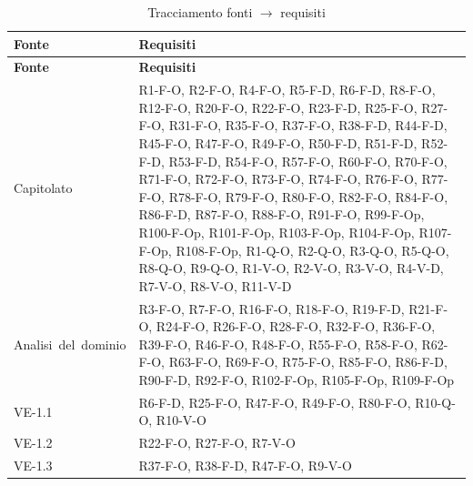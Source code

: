 {
    \small
    \renewcommand{\arraystretch}{1.3}
    \begin{longtable}{|>{\raggedright\arraybackslash}p{3.0cm}|>{\raggedright\arraybackslash}p{12.6cm}|}
    \caption{Tracciamento fonti $\rightarrow$ requisiti}\label{tab:trac-fonti-req}\\
    \hline
    \rowcolor[gray]{0.88} \textbf{Fonte} & \textbf{Requisiti} \\ \hline
    \endfirsthead
    \hline
    \rowcolor[gray]{0.88} \textbf{Fonte} & \textbf{Requisiti} \\ \hline
    \endhead

    \mbox{Capitolato} & \mbox{R1-F-O}, \mbox{R2-F-O}, \mbox{R4-F-O}, \mbox{R5-F-D}, \mbox{R6-F-D}, \mbox{R8-F-O}, \mbox{R12-F-O}, \mbox{R20-F-O}, \mbox{R22-F-O}, \mbox{R23-F-D}, \mbox{R25-F-O}, \mbox{R27-F-O}, \mbox{R31-F-O}, \mbox{R35-F-O}, \mbox{R37-F-O}, \mbox{R38-F-D}, \mbox{R44-F-D}, \mbox{R45-F-O}, \mbox{R47-F-O}, \mbox{R49-F-O}, \mbox{R50-F-D}, \mbox{R51-F-D}, \mbox{R52-F-D}, \mbox{R53-F-D}, \mbox{R54-F-O}, \mbox{R57-F-O}, \mbox{R60-F-O}, \mbox{R70-F-O}, \mbox{R71-F-O}, \mbox{R72-F-O}, \mbox{R73-F-O}, \mbox{R74-F-O}, \mbox{R76-F-O}, \mbox{R77-F-O}, \mbox{R78-F-O}, \mbox{R79-F-O}, \mbox{R80-F-O}, \mbox{R82-F-O}, \mbox{R84-F-O}, \mbox{R86-F-D}, \mbox{R87-F-O}, \mbox{R88-F-O}, \mbox{R91-F-O}, \mbox{R99-F-Op}, \mbox{R100-F-Op}, \mbox{R101-F-Op}, \mbox{R103-F-Op}, \mbox{R104-F-Op}, \mbox{R107-F-Op}, \mbox{R108-F-Op}, \mbox{R1-Q-O}, \mbox{R2-Q-O}, \mbox{R3-Q-O}, \mbox{R5-Q-O}, \mbox{R8-Q-O}, \mbox{R9-Q-O}, \mbox{R1-V-O}, \mbox{R2-V-O}, \mbox{R3-V-O}, \mbox{R4-V-D}, \mbox{R7-V-O}, \mbox{R8-V-O}, \mbox{R11-V-D} \\ \hline
    \mbox{Analisi del dominio} & \mbox{R3-F-O}, \mbox{R7-F-O}, \mbox{R16-F-O}, \mbox{R18-F-O}, \mbox{R19-F-D}, \mbox{R21-F-O}, \mbox{R24-F-O}, \mbox{R26-F-O}, \mbox{R28-F-O}, \mbox{R32-F-O}, \mbox{R36-F-O}, \mbox{R39-F-O}, \mbox{R46-F-O}, \mbox{R48-F-O}, \mbox{R55-F-O}, \mbox{R58-F-O}, \mbox{R62-F-O}, \mbox{R63-F-O}, \mbox{R69-F-O}, \mbox{R75-F-O}, \mbox{R85-F-O}, \mbox{R86-F-D}, \mbox{R90-F-D}, \mbox{R92-F-O}, \mbox{R102-F-Op}, \mbox{R105-F-Op}, \mbox{R109-F-Op} \\ \hline
    \mbox{VE-1.1} & \mbox{R6-F-D}, \mbox{R25-F-O}, \mbox{R47-F-O}, \mbox{R49-F-O}, \mbox{R80-F-O}, \mbox{R10-Q-O}, \mbox{R10-V-O} \\ \hline
    \mbox{VE-1.2} & \mbox{R22-F-O}, \mbox{R27-F-O}, \mbox{R7-V-O} \\ \hline
    \mbox{VE-1.3} & \mbox{R37-F-O}, \mbox{R38-F-D}, \mbox{R47-F-O}, \mbox{R9-V-O} \\ \hline

\end{longtable}}

